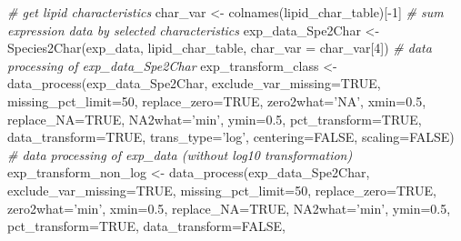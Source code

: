 \documentclass[]{article}
\newcommand{\hlnum}[1]{\textcolor[rgb]{0.816,0.125,0.439}{#1}}%
\newcommand{\hlstr}[1]{\textcolor[rgb]{0.251,0.627,0.251}{#1}}%
\newcommand{\hlcom}[1]{\textcolor[rgb]{0.502,0.502,0.502}{\textit{#1}}}%
\newcommand{\hlopt}[1]{\textcolor[rgb]{0,0,0}{#1}}%
\newcommand{\hlstd}[1]{\textcolor[rgb]{0.251,0.251,0.251}{#1}}%
\newcommand{\hlkwc}[1]{\textcolor[rgb]{0.251,0.251,0.251}{#1}}%
\newcommand{\hlkwd}[1]{\textcolor[rgb]{0.878,0.439,0.125}{#1}}%
\newenvironment{Shaded}{\begin{myshaded}}{\end{myshaded}}
\newcommand{\KeywordTok}[1]{\hlkwd{#1}}
\newcommand{\DataTypeTok}[1]{\hlkwc{#1}}
\newcommand{\DecValTok}[1]{\hlnum{#1}}
\newcommand{\FloatTok}[1]{\hlnum{#1}}
\newcommand{\StringTok}[1]{\hlstr{#1}}
\newcommand{\CommentTok}[1]{\hlcom{#1}}
\newcommand{\OtherTok}[1]{{#1}}
\newcommand{\OperatorTok}[1]{\hlopt{#1}}
\newcommand{\NormalTok}[1]{\hlstd{#1}}
\begin{document}
\begin{Shaded}
\begin{Highlighting}[]
\CommentTok{# get lipid characteristics}
\NormalTok{char_var <-}\StringTok{ }\KeywordTok{colnames}\NormalTok{(lipid_char_table)[}\OperatorTok{-}\DecValTok{1}\NormalTok{]}
\CommentTok{# sum expression data by selected characteristics}
\NormalTok{exp_data_Spe2Char <-}\StringTok{ }\KeywordTok{Species2Char}\NormalTok{(exp_data, lipid_char_table,}
                                  \DataTypeTok{char_var =}\NormalTok{ char_var[}\DecValTok{4}\NormalTok{])}
\CommentTok{# data processing of exp_data_Spe2Char}
\NormalTok{exp_transform_class <-}\StringTok{ }\KeywordTok{data_process}\NormalTok{(exp_data_Spe2Char, }
                                    \DataTypeTok{exclude_var_missing=}\OtherTok{TRUE}\NormalTok{, }
                                    \DataTypeTok{missing_pct_limit=}\DecValTok{50}\NormalTok{, }\DataTypeTok{replace_zero=}\OtherTok{TRUE}\NormalTok{,}
                                    \DataTypeTok{zero2what=}\StringTok{'NA'}\NormalTok{, }\DataTypeTok{xmin=}\FloatTok{0.5}\NormalTok{, }\DataTypeTok{replace_NA=}\OtherTok{TRUE}\NormalTok{,}
                                    \DataTypeTok{NA2what=}\StringTok{'min'}\NormalTok{, }\DataTypeTok{ymin=}\FloatTok{0.5}\NormalTok{, }
                                    \DataTypeTok{pct_transform=}\OtherTok{TRUE}\NormalTok{,}
                                    \DataTypeTok{data_transform=}\OtherTok{TRUE}\NormalTok{, }\DataTypeTok{trans_type=}\StringTok{'log'}\NormalTok{,}
                                    \DataTypeTok{centering=}\OtherTok{FALSE}\NormalTok{, }\DataTypeTok{scaling=}\OtherTok{FALSE}\NormalTok{)}
\CommentTok{# data processing of exp_data (without log10 transformation)}
\NormalTok{exp_transform_non_log <-}\StringTok{ }\KeywordTok{data_process}\NormalTok{(exp_data_Spe2Char,}
                                      \DataTypeTok{exclude_var_missing=}\OtherTok{TRUE}\NormalTok{,}
                                      \DataTypeTok{missing_pct_limit=}\DecValTok{50}\NormalTok{,}
                                      \DataTypeTok{replace_zero=}\OtherTok{TRUE}\NormalTok{,}
                                      \DataTypeTok{zero2what=}\StringTok{'min'}\NormalTok{, }\DataTypeTok{xmin=}\FloatTok{0.5}\NormalTok{,}
                                      \DataTypeTok{replace_NA=}\OtherTok{TRUE}\NormalTok{, }\DataTypeTok{NA2what=}\StringTok{'min'}\NormalTok{,}
                                      \DataTypeTok{ymin=}\FloatTok{0.5}\NormalTok{, }\DataTypeTok{pct_transform=}\OtherTok{TRUE}\NormalTok{,}
                                      \DataTypeTok{data_transform=}\OtherTok{FALSE}\NormalTok{,}

\end{Highlighting}
\end{Shaded}
\end{document}
